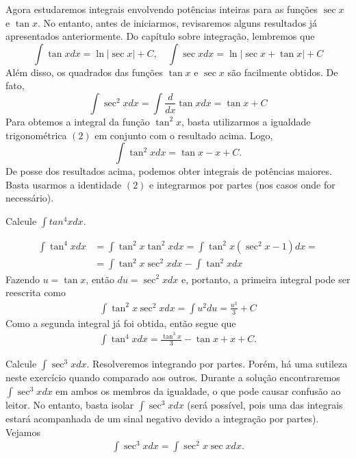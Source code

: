 	Agora estudaremos integrais envolvendo potências inteiras para as funções $\sec x$ e $\tan x$. No entanto, antes de iniciarmos, revisaremos alguns resultados já apresentados anteriormente. Do capítulo sobre integração, lembremos que $$ \int \tan xdx = \ln \left| \sec x \right| + C, \quad \int \sec x dx = \ln \left| \sec x + \tan x \right| + C $$ Além disso, os quadrados das funções $\tan x$ e $\sec x$ são facilmente obtidos. De fato, $$\int \sec^2xdx = \int \frac{d}{dx}\tan x dx = \tan x + C$$
	Para obtemos a integral da função $\tan ^2x$, basta utilizarmos a igualdade trigonométrica $(2)$ em conjunto com o resultado acima. Logo,  
	$$\int \tan^2 x dx = \tan x - x + C.$$
	De posse dos resultados acima, podemos obter integrais de potências maiores. Basta usarmos a identidade $(2)$ e integrarmos por partes (nos casos onde for necessário).
	
	\begin{ex}
		Calcule $\int tan^4xdx$. 
		
		\[\begin{split}
			\int \tan^4xdx & =\int \tan^2x \tan^2x dx =  \int \tan^2x(\sec^2x - 1)dx = \\ 
			& = \int \tan^2x \sec^2xdx - \int \tan^2xdx
		\end{split}\]
		Fazendo $u = \tan x$, então $du = \sec^2xdx$ e, portanto, a primeira integral pode ser reescrita como
		\[\begin{split}
			\int \tan^2x \sec^2xdx = \int u^2du = \frac{u^3}{3} + C
		\end{split}\]
		Como a segunda integral já foi obtida, então segue que 
		\[\begin{split}
			\int \tan^4xdx = \frac{\tan^3 x}{3} - \tan x +x + C. 
		\end{split}\]		 
	\end{ex}
	
	\begin{ex}
		Calcule $\int \sec^3 xdx$. Resolveremos integrando por partes. Porém, há uma sutileza neste exercício quando comparado aos outros. Durante a solução encontraremos $\int \sec^3xdx$ em ambos os membros da igualdade, o que pode causar confusão ao leitor. No entanto, basta isolar $\int \sec^3 xdx$ (será possível, pois uma das integrais estará acompanhada de um sinal negativo devido a integração por partes).  Vejamos 
		\[\begin{split}
			\int \sec^3 xdx = \int \sec^2x \sec xdx.
		\end{split}\]
		
	\end{ex}
	

